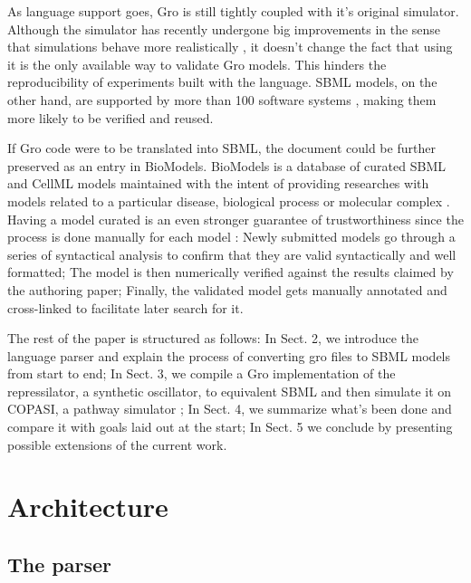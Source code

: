 \documentclass[12pt]{article}
\begin{document}
    As language support goes, Gro is still tightly coupled with it's original simulator. Although the simulator has recently undergone big improvements in the sense that simulations behave more realistically \cite{Gutirrez2017}, it doesn't change the fact that using it is the only available way to validate Gro models. This hinders the reproducibility of experiments built with the language. SBML models, on the other hand, are supported by more than 100 software systems \cite{Hucka2007}, making them more likely to be verified and reused.
    
    If Gro code were to be translated into SBML, the document could be further preserved as an entry in BioModels. BioModels is a database of curated SBML and CellML models maintained with the intent of providing researches with models related to a particular disease, biological process or molecular complex \cite{LeNovere2006}. Having a model curated is an even stronger guarantee of trustworthiness since the process is done manually for each model \cite{LeNovere2006}: Newly submitted models go through a series of syntactical analysis to confirm that they are valid syntactically and well formatted; The model is then numerically verified against the results claimed by the authoring paper; Finally, the validated model gets manually annotated and cross-linked to facilitate later search for it.
    
    The rest of the paper is structured as follows: In Sect. 2, we introduce the language parser and explain the process of converting gro files to SBML models from start to end; In Sect. 3, we compile a Gro implementation of the repressilator, a synthetic oscillator, to equivalent SBML and then simulate it on COPASI, a pathway simulator \cite{Hoops2006}; In Sect. 4, we summarize what's been done and compare it with goals laid out at the start; In Sect. 5 we conclude by presenting possible extensions of the current work.
    
    
\section{Architecture}

\subsection{The parser}
    
\end{document}

